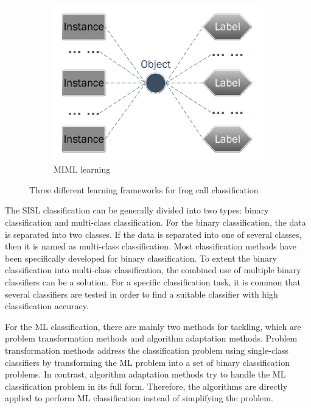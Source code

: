 \begin{figure}[htb!]
\begin{subfigure}[b]{0.32\textwidth}
           \includegraphics[width=1\textwidth,height=0.75\textwidth]{image/Method/MIML.pdf}
           \caption{MIML learning}
    \end{subfigure}
\caption[Different classification frameworks]{Three different learning frameworks for frog call classification}
\label{fig:framework}       %
\end{figure}



The SISL classification can be generally divided into two types: binary classification and multi-class classification. For the binary classification, the data is separated into two classes. If the data is separated into one of several classes, then it is named as multi-class classification. Most classification methods have been specifically developed for binary classification. To extent the binary classification into multi-class classification, the combined use of multiple binary classifiers can be a solution. For a specific classification task, it is common that several classifiers are tested in order to find a suitable classifier with high classification accuracy. 


For the ML classification, there are mainly two methods for tackling, which are problem transformation methods and algorithm adaptation methods. 
Problem transformation methods address the classification problem using single-class classifiers by transforming the ML problem into a set of binary classification problems. In contrast, algorithm adaptation methods try to handle the ML classification problem in its full form. Therefore, the algorithms are directly applied to perform ML classification instead of simplifying the problem.



